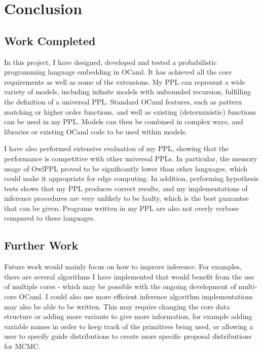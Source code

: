 \chapter{Conclusion}

\section{Work Completed}\vspace{-2mm}
In this project, I have designed, developed and tested a probabilistic programming language embedding in OCaml. It has achieved all the core requirements as well as some of the extensions. My PPL can represent a wide variety of models, including infinite models with unbounded recursion, fulfilling the definition of a universal PPL. Standard OCaml features, such as pattern matching or higher order functions, and well as existing (deterministic) functions can be used in my PPL. Models can then be combined in complex ways, and libraries or existing OCaml code to be used within models.

I have also performed extensive evaluation of my PPL, showing that the performance is competitive with other universal PPLs. In particular, the memory usage of OwlPPL proved to be significantly lower than other languages, which could make it appropriate for edge computing. In addition, performing hypothesis tests shows that my PPL produces correct results, and my implementations of inference procedures are very unlikely to be faulty, which is the best guarantee that can be given. Programs written in my PPL are also not overly verbose compared to these languages.

\section{Further Work}

Future work would mainly focus on how to improve inference. For examples, there are several algorithms I have implemented that would benefit from the use of multiple cores - which may be possible with the ongoing development of multi-core OCaml. I could also use more efficient inference algorithm implementations may also be able to be written. This may require changing the core data structure or adding more variants to give more information, for example adding variable names in order to keep track of the primitives being used, or allowing a user to specify guide distributions to create more specific proposal distributions for MCMC.

